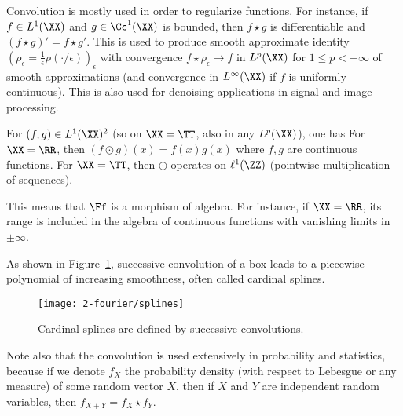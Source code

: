 
Convolution is mostly used in order to regularize functions. For instance, if $f \in L^1(\XX)$ and $g \in \Cc^1(\XX)$ is bounded, then $f \star g$ is differentiable and $(f \star g)'=f \star g'$. This is used to produce smooth approximate identity $(\rho_\epsilon = \frac{1}{\epsilon}\rho(\cdot/\epsilon))_\epsilon$ with convergence $f \star \rho_\epsilon \rightarrow f$ in $L^p(\XX)$ for $1 \leq p < +\infty$ of smooth approximations (and convergence in $L^\infty(\XX)$ if $f$ is uniformly continuous). 
%
This is also used for denoising applications in signal and image processing.



\begin{prop}
For $(f,g) \in L^1(\XX)^2$ (so on $\XX=\TT$, also in any $L^p(\XX)$), one has
For $\XX=\RR$, then $(f \odot g)(x) = f(x) g(x)$ where $f,g$ are continuous functions.  
For $\XX=\TT$, then $\odot$ operates on $\ell^1(\ZZ)$ (pointwise multiplication of sequences). 
\end{prop}


This means that $\Ff$ is a morphism of algebra. For instance, if $\XX=\RR$, its range is included in the algebra of continuous functions with vanishing limits in $\pm\infty$.

As shown in Figure~\ref{fig-splines}, successive convolution of a box leads to a piecewise polynomial of increasing smoothness, often called cardinal splines.

\begin{figure}
\centering
\texttt{[image: 2-fourier/splines]}
\caption{\label{fig-splines}
Cardinal splines are defined by successive convolutions.
}
\end{figure}


Note also that the convolution is used extensively in probability and statistics, because if we denote $f_X$ the probability density (with respect to Lebesgue or any measure) of some random vector $X$, then if $X$ and $Y$ are independent random variables, then $f_{X+Y}=f_X \star f_Y$. 


